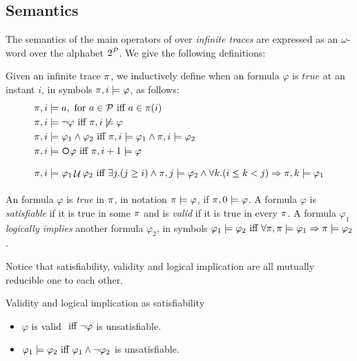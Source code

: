 \subsection{Semantics}
The semantics of the main operators of \LTL over \textit{infinite traces} are expressed as an $\omega$-word over the alphabet $2^\P$. We give the following definitions:
\begin{definition}\label{ltl-semantics}
Given an infinite trace $\trace$, we inductively define when an \LTL formula $\varphi$ is $true$ at an instant $i$, in symbols $\trace, i \models \varphi$, as follows:
\begin{align*}
\trace, i &\models a, \tm{for} a\in\P \tiff a \in \trace(i)\\
\trace, i &\models \lnot \varphi \tiff \trace, i \not\models \varphi\\
\trace, i &\models \varphi_1 \lAND \varphi_2 \tiff \trace, i \models \varphi_1 \lAND \trace, i \models \varphi_2\\
\trace, i &\models \Next\varphi \tiff \trace,i+1 \models \varphi\\
\trace, i &\models \varphi_1 \lUntil \varphi_2 \tiff \exists j. (j\ge i) \lAND \trace,j \models \varphi_2 \lAND\forall k. (i\le k < j) \Rightarrow \trace, k \models \varphi_1\\
\end{align*}
\end{definition}
\begin{definition}\label{ltl-sat-val-ent}
An \LTL formula $\varphi$ is \emph{true} in $\trace$, in notation $\trace \models \varphi$, if $\trace, 0 \models \varphi$. A formula $\varphi$ is \emph{satisfiable} if it is true in some $\trace$ and is \emph{valid} if it is true in every $\trace$. A formula $\varphi_1$ \emph{logically implies} another formula $\varphi_2$, in symbols $\varphi_1 \models \varphi_2 \tiff \forall \trace, \trace \models \varphi_1 \Rightarrow \trace \models \varphi_2$.
\end{definition}
Notice that satisfiability, validity and logical implication are all mutually reducible one to each other.
\begin{example}\label{ltl-sat-examples}
Validity and logical implication as satisfiability
\begin{itemize}
\item $\varphi$ is valid $\tiff \lnot \varphi$ is unsatisfiable.
\item $\varphi_1 \models \varphi_2 \tiff \varphi_1 \lAND \lnot \varphi_2$ is unsatisfiable.
\end{itemize}
\end{example}
